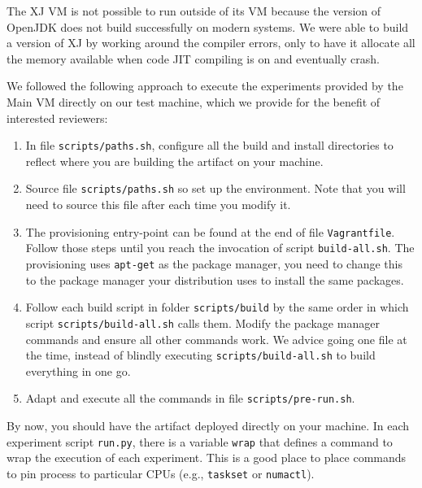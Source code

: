 \documentclass[12pt]{article}
\newcommand{\host}[1]{\colorbox{blue!20}{\texttt{\color{black}#1}}}
\begin{document}
The XJ VM is not possible to run outside of its VM because the version of
OpenJDK does not build successfully on modern systems.  We were able to build a
version of XJ by working around the compiler errors, only to have it allocate
all the memory available when code JIT compiling is on and eventually crash.

We followed the following approach to execute the experiments provided by the
Main VM directly on our test machine, which we provide for the benefit of interested reviewers:

\begin{enumerate}

    \item In file \host{scripts/paths.sh}, configure all the build and install
        directories to reflect where you are building the artifact on your
        machine.

    \item Source file \host{scripts/paths.sh} so set up the environment.  Note
        that you will need to source this file after each time you modify it.

    \item The provisioning entry-point can be found at the end of file
        \host{Vagrantfile}.  Follow those steps until you reach the invocation
        of script \texttt{build-all.sh}. The provisioning uses \texttt{apt-get}
        as the package manager, you need to change this to the package manager
        your distribution uses to install the same packages.

    \item Follow each build script in folder \host{scripts/build} by the same
        order in which script \host{scripts/build-all.sh} calls them.  Modify
        the package manager commands and ensure all other commands work.  We
        advice going one file at the time, instead of blindly executing
        \host{scripts/build-all.sh} to build everything in one go.

    \item Adapt and execute all the commands in file
        \host{scripts/pre-run.sh}.

\end{enumerate}

By now, you should have the artifact deployed directly on your machine.  In each
experiment script \texttt{run.py}, there is a variable \texttt{wrap} that
defines a command to wrap the execution of each experiment.  This is a good
place to place commands to pin process to particular CPUs (e.g.,
\texttt{taskset} or \texttt{numactl}).
\end{document}
